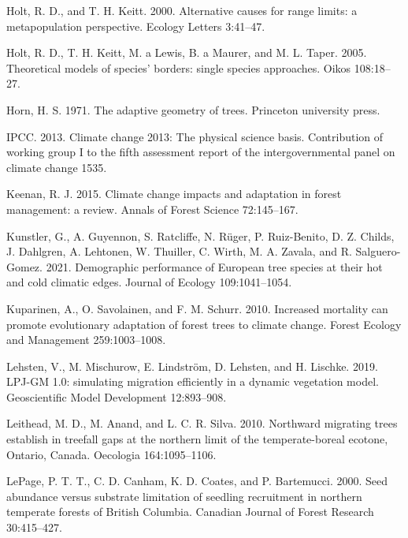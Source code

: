\documentclass[12pt]{article}
\newlength{\cslhangindent}
\newenvironment{cslreferences}%
  {\setlength{\parindent}{0pt}%
  \everypar{\setlength{\hangindent}{\cslhangindent}}\ignorespaces}%
  {\par}
\begin{document}
\begin{cslreferences}
\leavevmode\hypertarget{ref-Holt2000}{}%
Holt, R. D., and T. H. Keitt. 2000. Alternative causes for range limits:
a metapopulation perspective. Ecology Letters 3:41--47.

\leavevmode\hypertarget{ref-Holt2005}{}%
Holt, R. D., T. H. Keitt, M. a Lewis, B. a Maurer, and M. L. Taper.
2005. Theoretical models of species' borders: single species approaches.
Oikos 108:18--27.

\leavevmode\hypertarget{ref-horn1971adaptive}{}%
Horn, H. S. 1971. The adaptive geometry of trees. Princeton university
press.

\leavevmode\hypertarget{ref-IPCC2013}{}%
IPCC. 2013. Climate change 2013: The physical science basis.
Contribution of working group I to the fifth assessment report of the
intergovernmental panel on climate change 1535.

\leavevmode\hypertarget{ref-Keenan2015}{}%
Keenan, R. J. 2015. Climate change impacts and adaptation in forest
management: a review. Annals of Forest Science 72:145--167.

\leavevmode\hypertarget{ref-Kunstler2021}{}%
Kunstler, G., A. Guyennon, S. Ratcliffe, N. Rüger, P. Ruiz-Benito, D. Z.
Childs, J. Dahlgren, A. Lehtonen, W. Thuiller, C. Wirth, M. A. Zavala,
and R. Salguero-Gomez. 2021. Demographic performance of European tree
species at their hot and cold climatic edges. Journal of Ecology
109:1041--1054.

\leavevmode\hypertarget{ref-Kuparinen2010}{}%
Kuparinen, A., O. Savolainen, and F. M. Schurr. 2010. Increased
mortality can promote evolutionary adaptation of forest trees to climate
change. Forest Ecology and Management 259:1003--1008.

\leavevmode\hypertarget{ref-Lehsten2019}{}%
Lehsten, V., M. Mischurow, E. Lindström, D. Lehsten, and H. Lischke.
2019. LPJ-GM 1.0: simulating migration efficiently in a dynamic
vegetation model. Geoscientific Model Development 12:893--908.

\leavevmode\hypertarget{ref-Leithead2010}{}%
Leithead, M. D., M. Anand, and L. C. R. Silva. 2010. Northward migrating
trees establish in treefall gaps at the northern limit of the
temperate-boreal ecotone, Ontario, Canada. Oecologia 164:1095--1106.

\leavevmode\hypertarget{ref-LePage2000}{}%
LePage, P. T. T., C. D. Canham, K. D. Coates, and P. Bartemucci. 2000.
Seed abundance versus substrate limitation of seedling recruitment in
northern temperate forests of British Columbia. Canadian Journal of
Forest Research 30:415--427.


\end{cslreferences}
\end{document}
